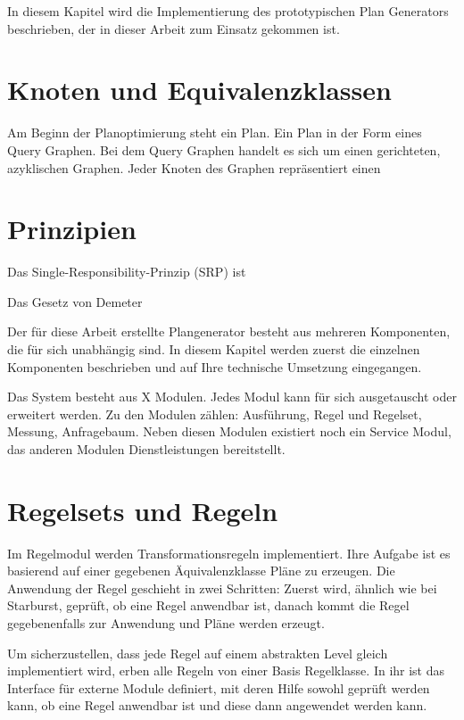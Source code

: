 In diesem Kapitel wird die Implementierung des prototypischen Plan Generators beschrieben, der in dieser Arbeit zum Einsatz gekommen ist.

\section{Knoten und Equivalenzklassen}

Am Beginn der Planoptimierung steht ein Plan. Ein Plan in der Form eines Query Graphen. Bei dem Query Graphen handelt es sich um einen gerichteten, azyklischen Graphen. Jeder Knoten des Graphen repräsentiert einen 

\section{Prinzipien}

Das  Single-Responsibility-Prinzip (SRP) ist 

Das Gesetz von Demeter




Der für diese Arbeit erstellte Plangenerator besteht aus mehreren Komponenten, die für sich unabhängig sind. In diesem Kapitel werden zuerst die einzelnen Komponenten beschrieben und auf Ihre technische Umsetzung eingegangen.


Das System besteht aus X Modulen. Jedes Modul kann für sich ausgetauscht oder erweitert werden. Zu den Modulen zählen: Ausführung, Regel und Regelset, Messung, Anfragebaum. Neben diesen Modulen existiert noch ein Service Modul, das anderen Modulen Dienstleistungen bereitstellt.

\section{Regelsets und Regeln}

Im Regelmodul werden Transformationsregeln implementiert. Ihre Aufgabe ist es basierend auf einer gegebenen Äquivalenzklasse Pläne zu erzeugen. Die Anwendung der Regel geschieht in zwei Schritten: Zuerst  wird, ähnlich wie bei Starburst, geprüft, ob eine Regel anwendbar ist, danach kommt die Regel gegebenenfalls zur Anwendung und Pläne werden erzeugt.

Um sicherzustellen, dass jede Regel auf einem abstrakten Level gleich implementiert wird, erben alle Regeln von einer Basis Regelklasse. In ihr ist das Interface für externe Module definiert, mit deren Hilfe sowohl geprüft werden kann, ob eine Regel anwendbar ist und diese dann angewendet werden kann.

